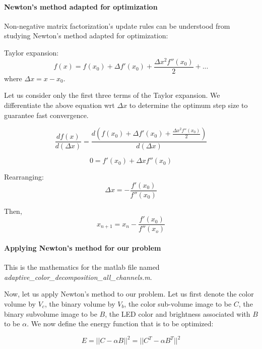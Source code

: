 \paragraph{Newton's method adapted for optimization}
Non-negative matrix factorization's update rules can be understood from studying Newton's method adapted for optimization:

Taylor expansion:
\begin{equation}
  f(x) = f(x_0) + \Delta f'(x_0) + \frac{\Delta x^2 f''(x_0)}{2} + ...
\end{equation}
where $\Delta x = x - x_0$.

Let us consider only the first three terms of the Taylor expansion. We differentiate the above equation wrt $\Delta x$ to determine the optimum step size to guarantee fast convergence.

\begin{equation}
  \frac{d f(x)}{d(\Delta x)} = \frac{d \left( f(x_0) + \Delta f'(x_0) + \frac{\Delta x^2 f''(x_0)}{2}\right)}{d(\Delta x)} 
\end{equation}

\begin{equation}
  0 = f'(x_0) + \Delta x f''(x_0)
\end{equation}

Rearranging:
\begin{equation}
  \Delta x = - \frac{f'(x_0)}{f''(x_0)}
\end{equation}

Then,
\begin{equation}
  x_{n+1} = x_n - \frac{f'(x_0)}{f''(x_o)}
\end{equation}

\paragraph{Applying Newton's method for our problem}

This is the mathematics for the matlab file named \emph{adaptive\_color\_decomposition\_all\_channels.m}.

Now, let us apply Newton's method to our problem. Let us first denote the color volume by $V_c$, the
binary volume by $V_b$, the color sub-volume image to be $C$, the binary subvolume image to be
$B$, the LED color and brightness associated with $B$ to be $\alpha$. We now define the energy
function that is to be optimized:

\begin{equation}
  E = ||C - \alpha B||^2 = ||C^T - \alpha B^T||^2
\end{equation}

